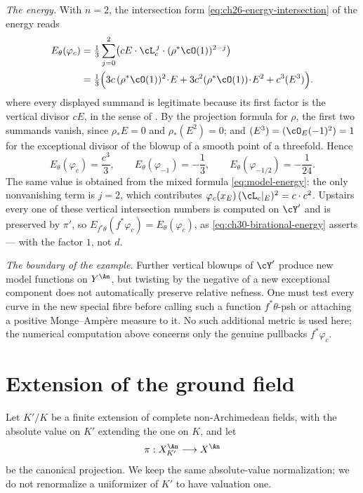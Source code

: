 \begin{example}
\emph{The energy.}  With \(n=2\), the intersection form
\eqref{eq:ch26-energy-intersection} of the energy reads
\[
\begin{aligned}
 E_\theta(\varphi_c)
 & =\tfrac13\sum_{j=0}^2
   \bigl(cE\cdot\cL_c^{\,j}\cdot(\rho^*\cO(1))^{2-j}\bigr)\\
 & =\tfrac13\Bigl(
   3c\,(\rho^*\cO(1))^2\!\cdot\!E
   +3c^2(\rho^*\cO(1))\!\cdot\!E^2
   +c^3(E^3)\Bigr).
\end{aligned}
\]
where every displayed summand is legitimate because its first factor is the
vertical divisor \(cE\), in the sense of
.  By the projection formula for \(\rho\), the first two summands
vanish, since \(\rho_*E=0\) and \(\rho_*(E^2)=0\); and \((E^3)=(\cO_E(-1)^2)
=1\) for the exceptional divisor of the blowup of a smooth point of a
threefold.  Hence
\begin{equation}
\label{eq:ch30-surface-energy}
 E_\theta(\varphi_c)=\frac{c^3}{3},
 \qquad
 E_\theta(\varphi_{-1})=-\frac13,
 \qquad
 E_\theta(\varphi_{-1/2})=-\frac1{24} .
\end{equation}
The same value is obtained from the mixed formula
\eqref{eq:model-energy}: the only nonvanishing term is \(j=2\), which
contributes \(\varphi_c(x_E)\,(\cL_c|_E)^2=c\cdot c^2\).  Upstairs every one
of these vertical intersection numbers is computed on \(\cY'\) and is
preserved by \(\pi'\), so
\(E_{f^*\theta}(f^*\varphi_c)=E_\theta(\varphi_c)\), as
\eqref{eq:ch30-birational-energy} asserts --- with the factor \(1\), not
\(d\).

\emph{The boundary of the example.}  Further vertical blowups of \(\cY'\)
produce new model functions on \(Y^{\An}\), but twisting by the negative of
a new exceptional component does not automatically preserve relative
nefness.  One must test every curve in the new special fibre before calling
such a function \(f^*\theta\)-psh or attaching a positive
Monge--Amp\`ere measure to it.  No such additional metric is used here; the
numerical computation above concerns only the genuine pullbacks
\(f^*\varphi_c\).
\end{example}

\section{Extension of the ground field}
\label{sec:ch30-base-change}

Let \(K'/K\) be a finite extension of complete non-Archimedean fields, with
the absolute value on \(K'\) extending the one on \(K\), and let
\begin{equation}
\label{eq:ch30-base-change-map}
               \pi:X_{K'}^{\An}\longrightarrow X^{\An}
\end{equation}
be the canonical projection.  We keep the same absolute-value
normalization; we do not renormalize a uniformizer of \(K'\) to have
valuation one.

